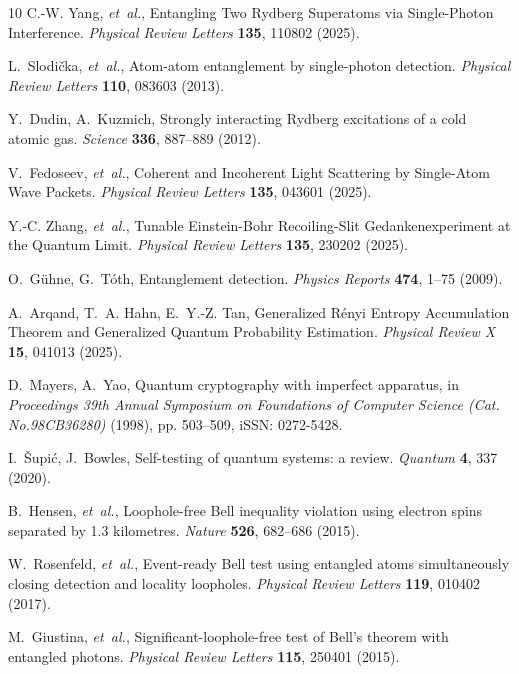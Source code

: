 \documentclass[aps,reprint,showpacs,superscriptaddress]{revtex4-2}
\begin{document}
\begin{thebibliography}{10}
C.-W. Yang, \emph{et~al.}, Entangling Two Rydberg Superatoms via Single-Photon
  Interference. \emph{Physical Review Letters} \textbf{135}, 110802 (2025).

L.~Slodi{\v{c}}ka, \emph{et~al.}, Atom-atom entanglement by single-photon
  detection. \emph{Physical Review Letters} \textbf{110}, 083603 (2013).

Y.~Dudin, A.~Kuzmich, Strongly interacting Rydberg excitations of a cold atomic
  gas. \emph{Science} \textbf{336}, 887--889 (2012).

V.~Fedoseev, \emph{et~al.}, Coherent and Incoherent Light Scattering by
  Single-Atom Wave Packets. \emph{Physical Review Letters} \textbf{135}, 043601
  (2025).

Y.-C. Zhang, \emph{et~al.}, Tunable Einstein-Bohr Recoiling-Slit
  Gedankenexperiment at the Quantum Limit. \emph{Physical Review Letters}
  \textbf{135}, 230202 (2025).

O.~G{\"u}hne, G.~T{\'o}th, Entanglement detection. \emph{Physics Reports}
  \textbf{474}, 1--75 (2009).

A.~Arqand, T.~A. Hahn, E.~Y.-Z. Tan, Generalized R\'enyi Entropy Accumulation
  Theorem and Generalized Quantum Probability Estimation. \emph{Physical Review
  X} \textbf{15}, 041013 (2025).

D.~Mayers, A.~Yao, Quantum cryptography with imperfect apparatus, in
  \emph{Proceedings 39th {Annual} {Symposium} on {Foundations} of {Computer}
  {Science} ({Cat}. {No}.{98CB36280})} (1998), pp. 503--509, iSSN: 0272-5428.

I.~{\v{S}}upi{\'c}, J.~Bowles, Self-testing of quantum systems: a review.
  \emph{Quantum} \textbf{4}, 337 (2020).

B.~Hensen, \emph{et~al.}, Loophole-free Bell inequality violation using
  electron spins separated by 1.3 kilometres. \emph{Nature} \textbf{526},
  682--686 (2015).

W.~Rosenfeld, \emph{et~al.}, Event-ready Bell test using entangled atoms
  simultaneously closing detection and locality loopholes. \emph{Physical
  Review Letters} \textbf{119}, 010402 (2017).

M.~Giustina, \emph{et~al.}, Significant-loophole-free test of Bell’s theorem
  with entangled photons. \emph{Physical Review Letters} \textbf{115}, 250401
  (2015).


\end{thebibliography}
\end{document}
